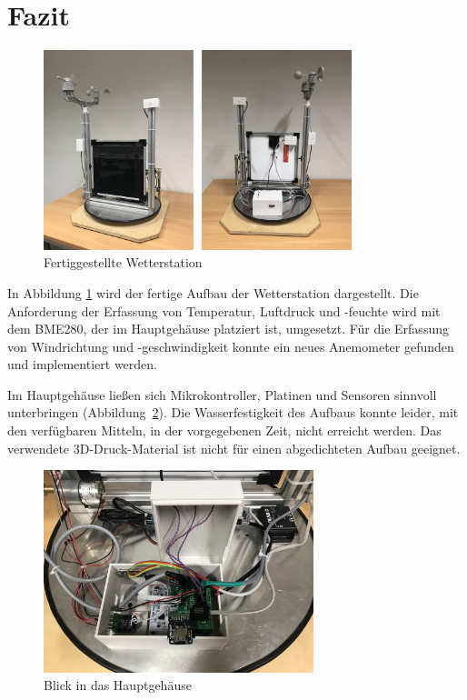 \pagebreak
\section{Fazit}\label{sec:fazit}
\begin{figure}[H]
  \centering
  \includegraphics[width=0.8\textwidth]{./img/Wetterstaion_fertig1.jpg}
  \caption{Fertiggestellte Wetterstation}\label{fig.Wetterstationfertig}
\end{figure}

In Abbildung \ref{fig.Wetterstationfertig} wird der fertige Aufbau der Wetterstation dargestellt. Die Anforderung der Erfassung von Temperatur, Luftdruck und -feuchte wird mit dem BME280, der im Hauptgehäuse platziert ist, umgesetzt. Für die Erfassung von Windrichtung und -geschwindigkeit konnte ein neues Anemometer gefunden und implementiert werden.

Im Hauptgehäuse ließen sich Mikrokontroller, Platinen und Sensoren sinnvoll unterbringen (Abbildung~\ref{fig.hauptgehauese}). Die Wasserfestigkeit des Aufbaus konnte leider, mit den verfügbaren Mitteln, in der vorgegebenen Zeit, nicht erreicht werden. Das verwendete 3D-Druck-Material ist nicht für einen abgedichteten Aufbau geeignet. 


\begin{figure}[H]
  \centering
  \includegraphics[width=0.7\textwidth]{./img/Hauptgehauese.jpg}
  \caption{Blick in das Hauptgehäuse}\label{fig.hauptgehauese}
\end{figure}


